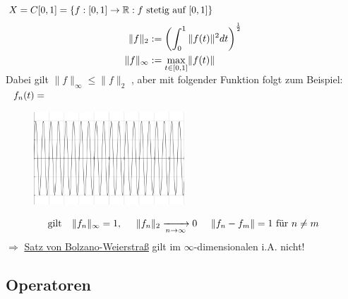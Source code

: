 \begin{beispiel}
$X = C[0, 1] = \{ f : [0, 1] \rightarrow \mathbb{R}: f \text{ stetig auf } [0, 1] \}$
\begin{align*}
\| f \|_{2} & := \left( \int_{0}^{1} \| f(t) \|^{2} dt \right)^{\frac{1}{2}} \\
\| f \|_{\infty} & :=  \smash{\displaystyle\max_{t \in [0, 1]}}  \| f(t) \|
\end{align*}
\newline
Dabei gilt $\| f \|_{\infty} \leq \| f \|_{2}$ , aber mit folgender Funktion folgt zum Beispiel:$\hspace{0.25cm} f_n(t) = $ \\
	\begin{figure}[H]
		\centering
		\includegraphics[width=160pt]{images/1.1.1-example1.png}
	\end{figure} \[ \text{gilt } \hspace{0.25cm} \| f_n \|_{\infty} = 1, \hspace{0.5cm} \| f_n \|_{2} \xrightarrow[n \rightarrow \infty]{} 0  
\hspace{0.5cm} \| f_{n} - f_{m} \| = 1 \text{ für } n \neq m \]
$ \Rightarrow $ \hyperref[satz:1.1-BolzanoWeierstrass]{Satz von Bolzano-Weierstra{\ss}} gilt im $\infty$-dimensionalen i.A. nicht!
\end{beispiel}

\subsection{Operatoren}

